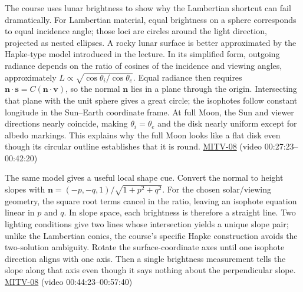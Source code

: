 \hypertarget{04-visual-computing-ii-ch032-why-the-moons-full-phase-can-look-flat-and-what-profiles-still-reveal}{}

The course uses lunar brightness to show why the Lambertian shortcut can fail dramatically. For Lambertian material, equal brightness on a sphere corresponds to equal incidence angle; those loci are circles around the light direction, projected as nested ellipses. A rocky lunar surface is better approximated by the Hapke-type model introduced in the lecture. In its simplified form, outgoing radiance depends on the ratio of cosines of the incidence and viewing angles, approximately \(L\propto\sqrt{\cos\theta_i/\cos\theta_e}\). Equal radiance then requires \(\mathbf n\cdot\mathbf s=C(\mathbf n\cdot\mathbf v)\), so the normal \(\mathbf n\) lies in a plane through the origin. Intersecting that plane with the unit sphere gives a great circle; the isophotes follow constant longitude in the Sun--Earth coordinate frame. At full Moon, the Sun and viewer directions nearly coincide, making \(\theta_i=\theta_e\) and the disk nearly uniform except for albedo markings. This explains why the full Moon looks like a flat disk even though its circular outline establishes that it is round. \hyperref[04-visual-computing-ii-ch036-mitv-08---shading-special-cases-lunar-surface-scanning-electron-microscope-greens-theorem]{MITV-08} (video 00:27:23--00:42:20)

The same model gives a useful local shape cue. Convert the normal to height slopes with \(\mathbf n=(-p,-q,1)/\sqrt{1+p^2+q^2}\). For the chosen solar/viewing geometry, the square root terms cancel in the ratio, leaving an isophote equation linear in \(p\) and \(q\). In slope space, each brightness is therefore a straight line. Two lighting conditions give two lines whose intersection yields a unique slope pair; unlike the Lambertian conics, the course's specific Hapke construction avoids the two-solution ambiguity. Rotate the surface-coordinate axes until one isophote direction aligns with one axis. Then a single brightness measurement tells the slope along that axis even though it says nothing about the perpendicular slope. \hyperref[04-visual-computing-ii-ch036-mitv-08---shading-special-cases-lunar-surface-scanning-electron-microscope-greens-theorem]{MITV-08} (video 00:44:23--00:57:40)

